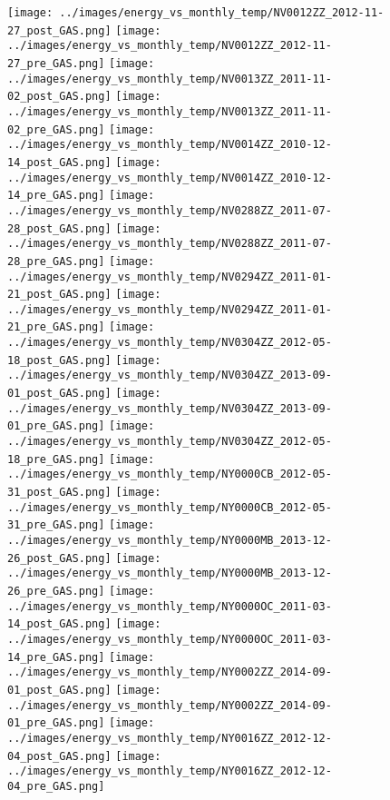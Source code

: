 \clearpage
\begin{figure}
\centering
\texttt{[image: ../images/energy\_vs\_monthly\_temp/NV0012ZZ\_2012-11-27\_post\_GAS.png]}
\texttt{[image: ../images/energy\_vs\_monthly\_temp/NV0012ZZ\_2012-11-27\_pre\_GAS.png]}
\texttt{[image: ../images/energy\_vs\_monthly\_temp/NV0013ZZ\_2011-11-02\_post\_GAS.png]}
\texttt{[image: ../images/energy\_vs\_monthly\_temp/NV0013ZZ\_2011-11-02\_pre\_GAS.png]}
\texttt{[image: ../images/energy\_vs\_monthly\_temp/NV0014ZZ\_2010-12-14\_post\_GAS.png]}
\texttt{[image: ../images/energy\_vs\_monthly\_temp/NV0014ZZ\_2010-12-14\_pre\_GAS.png]}
\texttt{[image: ../images/energy\_vs\_monthly\_temp/NV0288ZZ\_2011-07-28\_post\_GAS.png]}
\texttt{[image: ../images/energy\_vs\_monthly\_temp/NV0288ZZ\_2011-07-28\_pre\_GAS.png]}
\texttt{[image: ../images/energy\_vs\_monthly\_temp/NV0294ZZ\_2011-01-21\_post\_GAS.png]}
\texttt{[image: ../images/energy\_vs\_monthly\_temp/NV0294ZZ\_2011-01-21\_pre\_GAS.png]}
\texttt{[image: ../images/energy\_vs\_monthly\_temp/NV0304ZZ\_2012-05-18\_post\_GAS.png]}
\texttt{[image: ../images/energy\_vs\_monthly\_temp/NV0304ZZ\_2013-09-01\_post\_GAS.png]}
\texttt{[image: ../images/energy\_vs\_monthly\_temp/NV0304ZZ\_2013-09-01\_pre\_GAS.png]}
\texttt{[image: ../images/energy\_vs\_monthly\_temp/NV0304ZZ\_2012-05-18\_pre\_GAS.png]}
\texttt{[image: ../images/energy\_vs\_monthly\_temp/NY0000CB\_2012-05-31\_post\_GAS.png]}
\texttt{[image: ../images/energy\_vs\_monthly\_temp/NY0000CB\_2012-05-31\_pre\_GAS.png]}
\texttt{[image: ../images/energy\_vs\_monthly\_temp/NY0000MB\_2013-12-26\_post\_GAS.png]}
\texttt{[image: ../images/energy\_vs\_monthly\_temp/NY0000MB\_2013-12-26\_pre\_GAS.png]}
\texttt{[image: ../images/energy\_vs\_monthly\_temp/NY0000OC\_2011-03-14\_post\_GAS.png]}
\texttt{[image: ../images/energy\_vs\_monthly\_temp/NY0000OC\_2011-03-14\_pre\_GAS.png]}
\texttt{[image: ../images/energy\_vs\_monthly\_temp/NY0002ZZ\_2014-09-01\_post\_GAS.png]}
\texttt{[image: ../images/energy\_vs\_monthly\_temp/NY0002ZZ\_2014-09-01\_pre\_GAS.png]}
\texttt{[image: ../images/energy\_vs\_monthly\_temp/NY0016ZZ\_2012-12-04\_post\_GAS.png]}
\texttt{[image: ../images/energy\_vs\_monthly\_temp/NY0016ZZ\_2012-12-04\_pre\_GAS.png]}
\end{figure}

